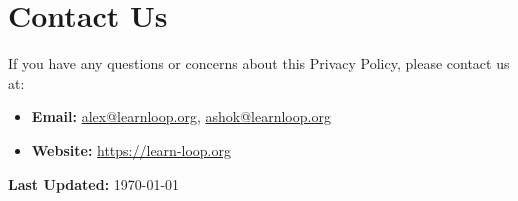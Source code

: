 \documentclass[12pt]{article}
\begin{document}
\section{Contact Us}
If you have any questions or concerns about this Privacy Policy, please contact us at:
\begin{itemize}[leftmargin=*]
    \item \textbf{Email:} \href{mailto:alex@learnloop.org}{alex@learnloop.org}, \href{mailto:ashok@learnloop.org}{ashok@learnloop.org}
    \item \textbf{Website:} \href{https://learn-loop.org}{https://learn-loop.org}
\end{itemize}

\vspace{1em}
\noindent \textbf{Last Updated:} \today
\end{document}
